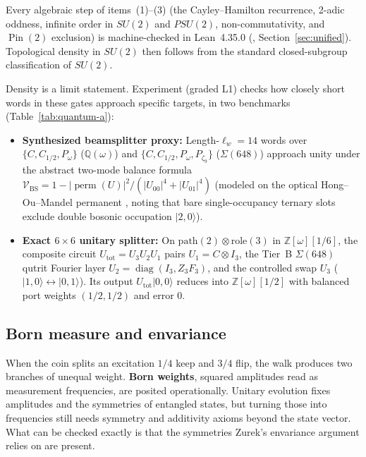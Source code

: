 Every algebraic step of items~(1)--(3) (the Cayley--Hamilton recurrence, 2-adic oddness, infinite order in $SU(2)$ and
$PSU(2)$, non-commutativity, and $\operatorname{Pin}(2)$ exclusion) is machine-checked in Lean~4.35.0
(, Section~\ref{sec:unified}). Topological density in $SU(2)$ then follows from the standard
closed-subgroup classification of $SU(2)$.

Density is a limit statement. Experiment  (graded L1) checks how closely short words in these gates
approach specific targets, in two benchmarks (Table~\ref{tab:quantum-a}):
\begin{itemize}[itemsep=2pt]
\item \textbf{Synthesized beamsplitter proxy:} Length-$\ell_w = 14$ words over $\{C, C_{1/2}, P_\omega\}$
($\mathbb{Q}(\omega)$) and $\{C, C_{1/2}, P_\omega, P_{\zeta_9}\}$ ($\Sigma(648)$) approach unity under the abstract
two-mode balance formula $\mathcal{V}_{\mathrm{BS}} = 1 - |\operatorname{perm}(U)|^2 / (|U_{00}|^4 + |U_{01}|^4)$
(modeled on the optical Hong--Ou--Mandel permanent \cite{hong1987}, noting that bare single-occupancy ternary slots exclude
double bosonic occupation $|2, 0\rangle$).
\item \textbf{Exact $6 \times 6$ unitary splitter:} On $\mathrm{path}(2) \otimes \mathrm{role}(3)$ in
$\mathbb{Z}[\omega][1/6]$, the composite circuit $U_{\mathrm{tot}} = U_3 U_2 U_1$ pairs $U_1 = C \otimes I_3$, the
Tier~B $\Sigma(648)$ qutrit Fourier layer $U_2 = \operatorname{diag}(I_3, Z_3 F_3)$, and the controlled swap
$U_3$ ($|1,0\rangle \leftrightarrow |0,1\rangle$). Its output $U_{\mathrm{tot}}|0,0\rangle$ reduces into
$\mathbb{Z}[\omega][1/2]$ with balanced port weights $(1/2, 1/2)$ and error $0$.
\end{itemize}

\subsection{Born measure and envariance}

When the coin splits an excitation $1/4$ keep and $3/4$ flip, the walk produces two branches of unequal weight.
\textbf{Born weights}, squared amplitudes read as measurement
frequencies, are posited operationally. Unitary evolution fixes amplitudes and the symmetries of entangled states, but
turning those into frequencies still needs symmetry and additivity axioms beyond the state vector. What can be checked
exactly is that the symmetries Zurek's envariance argument relies on are present.

